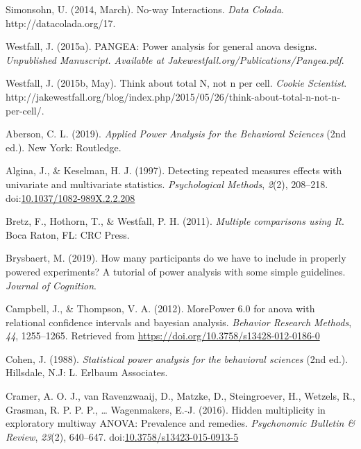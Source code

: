 \documentclass[
  ,jou,floatsintext]{apa6}
\begin{document}
\leavevmode\hypertarget{ref-simonsohn_no-way_2014}{}%
Simonsohn, U. (2014, March). No-way Interactions. \emph{Data Colada}. http://datacolada.org/17.

\leavevmode\hypertarget{ref-westfall2015pangea}{}%
Westfall, J. (2015a). PANGEA: Power analysis for general anova designs. \emph{Unpublished Manuscript. Available at Jakewestfall.org/Publications/Pangea.pdf}.

\leavevmode\hypertarget{ref-westfall_think_2015}{}%
Westfall, J. (2015b, May). Think about total N, not n per cell. \emph{Cookie Scientist}. http://jakewestfall.org/blog/index.php/2015/05/26/think-about-total-n-not-n-per-cell/.

\leavevmode\hypertarget{ref-aberson_applied_2019}{}%
Aberson, C. L. (2019). \emph{Applied Power Analysis for the Behavioral Sciences} (2nd ed.). New York: Routledge.

\leavevmode\hypertarget{ref-algina_detecting_1997}{}%
Algina, J., \& Keselman, H. J. (1997). Detecting repeated measures effects with univariate and multivariate statistics. \emph{Psychological Methods}, \emph{2}(2), 208--218. doi:\href{https://doi.org/10.1037/1082-989X.2.2.208}{10.1037/1082-989X.2.2.208}

\leavevmode\hypertarget{ref-bretz_multiple_2011}{}%
Bretz, F., Hothorn, T., \& Westfall, P. H. (2011). \emph{Multiple comparisons using R}. Boca Raton, FL: CRC Press.

\leavevmode\hypertarget{ref-brysbaert_how_2019}{}%
Brysbaert, M. (2019). How many participants do we have to include in properly powered experiments? A tutorial of power analysis with some simple guidelines. \emph{Journal of Cognition}.

\leavevmode\hypertarget{ref-Campbell2012MorePower6F}{}%
Campbell, J., \& Thompson, V. A. (2012). MorePower 6.0 for anova with relational confidence intervals and bayesian analysis. \emph{Behavior Research Methods}, \emph{44}, 1255--1265. Retrieved from \url{https://doi.org/10.3758/s13428-012-0186-0}

\leavevmode\hypertarget{ref-cohen_statistical_1988}{}%
Cohen, J. (1988). \emph{Statistical power analysis for the behavioral sciences} (2nd ed.). Hillsdale, N.J: L. Erlbaum Associates.

\leavevmode\hypertarget{ref-cramer_hidden_2016}{}%
Cramer, A. O. J., van Ravenzwaaij, D., Matzke, D., Steingroever, H., Wetzels, R., Grasman, R. P. P. P., \ldots{} Wagenmakers, E.-J. (2016). Hidden multiplicity in exploratory multiway ANOVA: Prevalence and remedies. \emph{Psychonomic Bulletin \& Review}, \emph{23}(2), 640--647. doi:\href{https://doi.org/10.3758/s13423-015-0913-5}{10.3758/s13423-015-0913-5}
\end{document}
